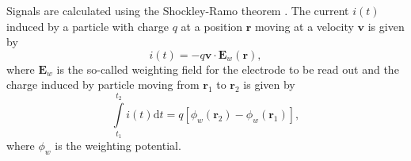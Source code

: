 Signals are calculated using the Shockley-Ramo theorem \cite{Shockley1938,Ramo1939}. 
The current \(i\left(t\right)\) induced by a particle with charge 
\(q\) at a position \(\mathbf{r}\) moving at a velocity \(\mathbf{v}\)
is given by
\begin{equation}\label{Eqn:RamoShockleyWeightingField}
  i\left(t\right) = -q \mathbf{v} \cdot \mathbf{E}_{w}\left(\mathbf{r}\right),
\end{equation}
where \(\mathbf{E}_{w}\) is the so-called weighting field for the 
electrode to be read out and the charge induced by particle moving from 
$\mathbf{r}_{1}$ to $\mathbf{r}_{2}$ is given by
\begin{equation}\label{Eqn:RamoShockleyWeightingPotential}
  \int\limits_{t_{1}}^{t_{2}}i\left(t\right)\text{d}t = q\left[\phi_{w}\left(\mathbf{r}_{2}\right) - \phi_{w}\left(\mathbf{r}_{1}\right)\right],
\end{equation} 
where $\phi_{w}$ is the weighting potential.


